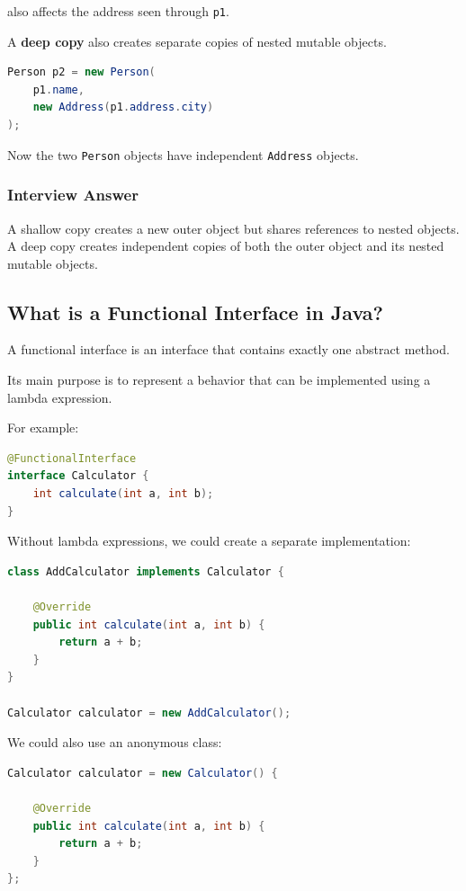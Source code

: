 \documentclass[12pt,a4paper]{article}
\begin{document}
also affects the address seen through \texttt{p1}.

A \textbf{deep copy} also creates separate copies of nested mutable objects.

\begin{lstlisting}[language=Java]
Person p2 = new Person(
    p1.name,
    new Address(p1.address.city)
);
\end{lstlisting}

Now the two \texttt{Person} objects have independent
\texttt{Address} objects.

\subsubsection*{Interview Answer}

A shallow copy creates a new outer object but shares references to nested
objects. A deep copy creates independent copies of both the outer object
and its nested mutable objects.

\subsection{What is a Functional Interface in Java?}

A functional interface is an interface that contains exactly one abstract
method.

Its main purpose is to represent a behavior that can be implemented using a
lambda expression.

For example:

\begin{lstlisting}[language=Java]
@FunctionalInterface
interface Calculator {
    int calculate(int a, int b);
}
\end{lstlisting}

Without lambda expressions, we could create a separate implementation:

\begin{lstlisting}[language=Java]
class AddCalculator implements Calculator {

    @Override
    public int calculate(int a, int b) {
        return a + b;
    }
}

Calculator calculator = new AddCalculator();
\end{lstlisting}

We could also use an anonymous class:

\begin{lstlisting}[language=Java]
Calculator calculator = new Calculator() {

    @Override
    public int calculate(int a, int b) {
        return a + b;
    }
};
\end{lstlisting}
\end{document}
